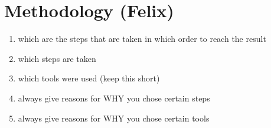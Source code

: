 \section{Methodology (Felix)}
\begin{enumerate}
    \item which are the steps that are taken in which order to reach the result
    \item which steps are taken
    \item which tools were used (keep this short)
    \item always give reasons for WHY you chose certain steps
    \item always give reasons for WHY you chose certain tools
\end{enumerate}
